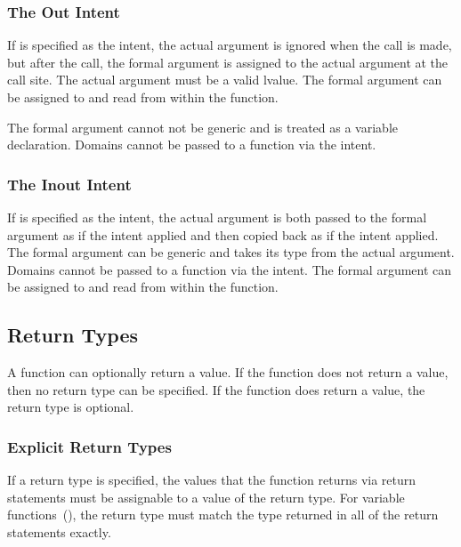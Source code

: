 \subsubsection{The Out Intent}
\label{The_Out_Intent}

If  is specified as the intent, the actual argument is
ignored when the call is made, but after the call, the formal argument
is assigned to the actual argument at the call site.  The actual
argument must be a valid lvalue.  The formal argument can be assigned
to and read from within the function.

The formal argument cannot not be generic and is treated as a variable
declaration.  Domains cannot be passed to a function via
the  intent.

\subsubsection{The Inout Intent}
\label{The_Inout_Intent}

If  is specified as the intent, the actual argument is
both passed to the formal argument as if the  intent applied
and then copied back as if the  intent applied.  The formal
argument can be generic and takes its type from the actual argument.
Domains cannot be passed to a function via the  intent.
The formal argument can be assigned to and read from within the
function.

\subsection{Return Types}
\label{Return_Types}

A function can optionally return a value.  If the function does not
return a value, then no return type can be specified.  If the function
does return a value, the return type is optional.

\subsubsection{Explicit Return Types}
\label{Explicit_Return_Types}

If a return type is specified, the values that the function returns
via return statements must be assignable to a value of the return
type.  For variable functions~(), the return
type must match the type returned in all of the return statements
exactly.

